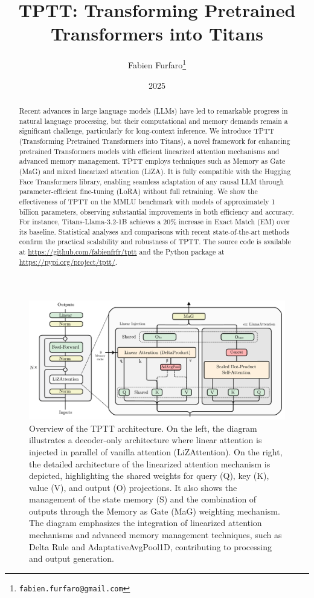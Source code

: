 \documentclass[10pt,a4paper]{article}
\title{\Large\textbf{TPTT: Transforming Pretrained Transformers into Titans}}
\author{\large Fabien Furfaro\thanks{\texttt{fabien.furfaro@gmail.com}}}
\date{\large 2025}
\begin{document}
\maketitle

\begin{abstract}
Recent advances in large language models (LLMs) have led to remarkable progress in natural language processing, but their computational and memory demands remain a significant challenge, particularly for long-context inference. We introduce TPTT (Transforming Pretrained Transformers into Titans), a novel framework for enhancing pretrained Transformers models with efficient linearized attention mechanisms and advanced memory management. TPTT employs techniques such as Memory as Gate (MaG) and mixed linearized attention (LiZA). It is fully compatible with the Hugging Face Transformers library, enabling seamless adaptation of any causal LLM through parameter-efficient fine-tuning (LoRA) without full retraining. We show the effectiveness of TPTT on the MMLU benchmark with models of approximately 1 billion parameters, observing substantial improvements in both efficiency and accuracy. For instance, Titans-Llama-3.2-1B achieves a 20\% increase in Exact Match (EM) over its baseline. Statistical analyses and comparisons with recent state-of-the-art methods confirm the practical scalability and robustness of TPTT. The source code is available at \url{https://github.com/fabienfrfr/tptt} and the Python package at \url{https://pypi.org/project/tptt/}.
\end{abstract}


\begin{figure}[ht]
    \centering
    \includegraphics[width=0.8\linewidth]{fig.pdf}
    \caption{Overview of the TPTT architecture. On the left, the diagram illustrates a decoder-only architecture where linear attention is injected in parallel of vanilla attention (LiZAttention). On the right, the detailed architecture of the linearized attention mechanism is depicted, highlighting the shared weights for query (Q), key (K), value (V), and output (O) projections. It also shows the management of the state memory (S) and the combination of outputs through the Memory as Gate (MaG) weighting mechanism. The diagram emphasizes the integration of linearized attention mechanisms and advanced memory management techniques, such as Delta Rule and AdaptativeAvgPool1D, contributing to processing and output generation.}
    \label{fig:approach_overview}
\end{figure}
\end{document}
